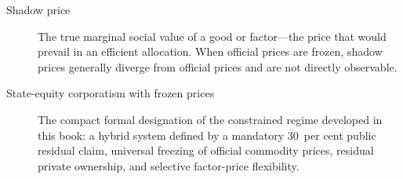 \documentclass[12pt,anyside]{book}
\theoremstyle{definition}
\theoremstyle{plain}
\theoremstyle{remark}
\begin{document}
\begin{description}
\item[Shadow price]  
The true marginal social value of a good or factor—the price that would prevail in an efficient allocation. When official prices are frozen, shadow prices generally diverge from official prices and are not directly observable.

\item[State-equity corporatism with frozen prices]  
The compact formal designation of the constrained regime developed in this book: a hybrid system defined by a mandatory 30~per cent public residual claim, universal freezing of official commodity prices, residual private ownership, and selective factor-price flexibility.
\end{description}

\end{document}
